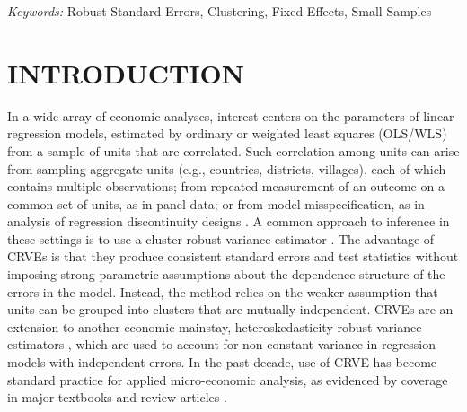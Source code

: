 \documentclass[12pt]{article}\usepackage[]{graphicx}\usepackage[]{color}
\begin{document}
\noindent%
{\it Keywords:} Robust Standard Errors, Clustering, Fixed-Effects, Small Samples
\vfill

\newpage
{} %

\section{INTRODUCTION}
\label{sec:intro}

In a wide array of economic analyses, interest centers on the parameters of linear regression models, estimated by ordinary or weighted least squares (OLS/WLS) from a sample of units that are correlated. 
Such correlation among units can arise from sampling aggregate units (e.g., countries, districts, villages), each of which contains multiple observations; from repeated measurement of an outcome on a common set of units, as in panel data; or from model misspecification, as in analysis of regression discontinuity designs \citep[e.g.,][]{Lee2008regression}. 
A common approach to inference in these settings is to use a cluster-robust variance estimator \citep[CRVE;][]{Arellano1987computing, Liang1986longitudinal, white1984asymptotic}.
The advantage of CRVEs is that they produce consistent standard errors and test statistics without imposing strong parametric assumptions about the dependence structure of the errors in the model.
Instead, the method relies on the weaker assumption that units can be grouped into clusters that are mutually independent. 
CRVEs are an extension to another economic mainstay, heteroskedasticity-robust variance estimators \citep{eicker1967limit, Huber1967behavior, White1980heteroskedasticity}, which are used to account for non-constant variance in regression models with independent errors.
In the past decade, use of CRVE has become standard practice for applied micro-economic analysis, as evidenced by coverage in major textbooks and review articles \citep[e.g.,][]{Wooldridge2010econometric, Angrist2009mostly, Cameron2015practitioners}.
\end{document}
